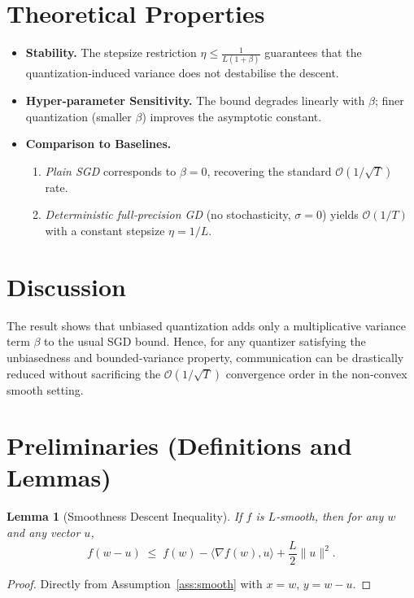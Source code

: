 \documentclass{article}
\newtheorem{lemma}{Lemma}
\begin{document}
\section*{Theoretical Properties}
\begin{itemize}
    \item \textbf{Stability.} The stepsize restriction $\eta\le\frac{1}{L(1+\beta)}$ guarantees that the quantization‑induced variance does not destabilise the descent.
    \item \textbf{Hyper‑parameter Sensitivity.} The bound degrades linearly with $\beta$; finer quantization (smaller $\beta$) improves the asymptotic constant.
    \item \textbf{Comparison to Baselines.}
    \begin{enumerate}[label=(\alph*)]
        \item \emph{Plain SGD} corresponds to $\beta=0$, recovering the standard $\mathcal{O}(1/\sqrt{T})$ rate.
        \item \emph{Deterministic full‑precision GD} (no stochasticity, $\sigma=0$) yields $\mathcal{O}(1/T)$ with a constant stepsize $\eta=1/L$.
    \end{enumerate}
\end{itemize}

\section*{Discussion}
The result shows that unbiased quantization adds only a multiplicative variance term $\beta$ to the usual SGD bound. Hence, for any quantizer satisfying the unbiasedness and bounded‑variance property, communication can be drastically reduced without sacrificing the $\mathcal{O}(1/\sqrt{T})$ convergence order in the non‑convex smooth setting.

\section*{Preliminaries (Definitions and Lemmas)}
\begin{lemma}[Smoothness Descent Inequality]\label{lem:smooth}
If $f$ is $L$‑smooth, then for any $w$ and any vector $u$,
\[
    f(w-u)\;\le\; f(w)-\langle\nabla f(w),u\rangle+\frac{L}{2}\|u\|^2 .
\]
\end{lemma}
\begin{proof}
Directly from Assumption~\ref{ass:smooth} with $x=w$, $y=w-u$.
\end{proof}
\end{document}
